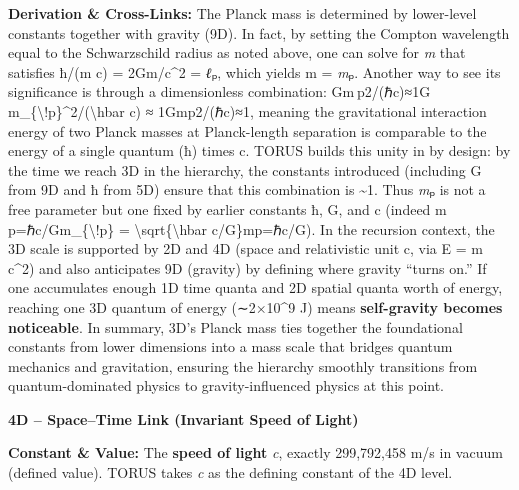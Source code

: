 \documentclass[
]{article}
\begin{document}
\textbf{Derivation \& Cross-Links:} The Planck mass is determined by
lower-level constants together with gravity (9D). In fact, by setting
the Compton wavelength equal to the Schwarzschild radius as noted above,
one can solve for \emph{m} that satisfies ħ/(m c) = 2Gm/c\^{}2 =
\emph{ℓ}ₚ, which yields m = \emph{m}ₚ\hspace{0pt}. Another way to see
its significance is through a dimensionless combination: Gm ⁣p2/(ℏc)≈1G
m\_\{\textbackslash!p\}\^{}2/(\textbackslash hbar c) ≈
1Gmp2\hspace{0pt}/(ℏc)≈1\hspace{0pt}, meaning the gravitational
interaction energy of two Planck masses at Planck-length separation is
comparable to the energy of a single quantum (ħ) times c. TORUS builds
this unity in by design: by the time we reach 3D in the hierarchy, the
constants introduced (including G from 9D and ħ from 5D) ensure that
this combination is \textasciitilde1\hspace{0pt}. Thus \emph{m}ₚ is not
a free parameter but one fixed by earlier constants ħ, G, and c (indeed
m ⁣p=ℏc/Gm\_\{\textbackslash!p\} =
\textbackslash sqrt\{\textbackslash hbar
c/G\}mp\hspace{0pt}=ℏc/G\hspace{0pt}). In the recursion context, the 3D
scale is supported by 2D and 4D (space and relativistic unit c, via E =
m c\^{}2) and also anticipates 9D (gravity) by defining where gravity
``turns on.'' If one accumulates enough 1D time quanta and 2D spatial
quanta worth of energy, reaching one 3D quantum of energy (∼2×10\^{}9 J)
means \textbf{self-gravity becomes noticeable}\hspace{0pt}. In summary,
3D's Planck mass ties together the foundational constants from lower
dimensions into a mass scale that bridges quantum mechanics and
gravitation, ensuring the hierarchy smoothly transitions from
quantum-dominated physics to gravity-influenced physics at this point.

\textbf{4D -- Space--Time Link (Invariant Speed of Light)}

\textbf{Constant \& Value:} The \textbf{speed of light} \emph{c},
exactly 299,792,458 m/s in vacuum (defined value)\hspace{0pt}. TORUS
takes \emph{c} as the defining constant of the 4D level.
\end{document}
